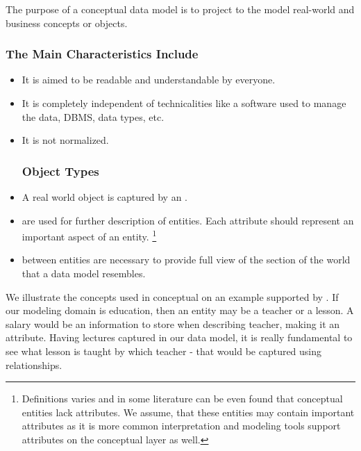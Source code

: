 The purpose of a conceptual data model is to project to the model real-world and business concepts or objects. \\

\subsubsection{The Main Characteristics Include}
\begin{itemize}
	\item It is aimed to be readable and understandable by everyone.
	\item It is completely independent of technicalities like a software used to manage the data, DBMS, data types, etc.
	\item It is not normalized.
	\subsubsection{Object Types}
	\item A real world object is captured by an .
	\item {} are used for further description of entities. 
	 Each attribute should represent an important aspect of an entity. \footnote{Definitions varies and in some literature can be even found that conceptual entities lack attributes. We assume, that these entities may contain important attributes as it is more common interpretation and modeling tools support attributes on the conceptual layer as well.} 
	 \item {} between entities are necessary to provide full view of the section of the world that a data model resembles.
\end{itemize}

We illustrate the concepts used in conceptual on an example supported by .
If our modeling domain is education, then an entity may be a teacher or a lesson. 
A salary would be an information to store when describing teacher, making it an attribute.
Having lectures captured in our data model, it is really fundamental to see what lesson is taught by which teacher - that would be captured using relationships.

